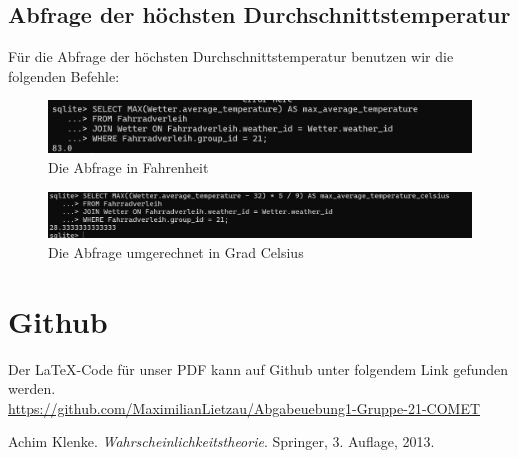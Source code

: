 \documentclass[a4paper,11pt]{article}
\begin{document}
\subsection{Abfrage der höchsten Durchschnittstemperatur}

Für die Abfrage der höchsten Durchschnittstemperatur benutzen wir die folgenden Befehle: 

\begin{figure}[h]
\centering
\includegraphics[scale=.5]{Abfrage.png}
\caption{Die Abfrage in Fahrenheit}
\label{fig:meine-grafik3}
\end{figure}

\begin{figure}[h]
\centering
\includegraphics[scale=.4]{Abfrage Celsius.png}
\caption{Die Abfrage umgerechnet in Grad Celsius}
\label{fig:meine-grafik4}
\end{figure}

\section{Github}

Der \LaTeX-Code für unser PDF kann auf Github unter folgendem Link gefunden werden.\\   
\url{https://github.com/MaximilianLietzau/Abgabeuebung1-Gruppe-21-COMET}

\begin{thebibliography}{9}
Achim Klenke. \textit{Wahrscheinlichkeitstheorie}. Springer, 3. Auflage, 2013.
\end{thebibliography}
\end{document}
